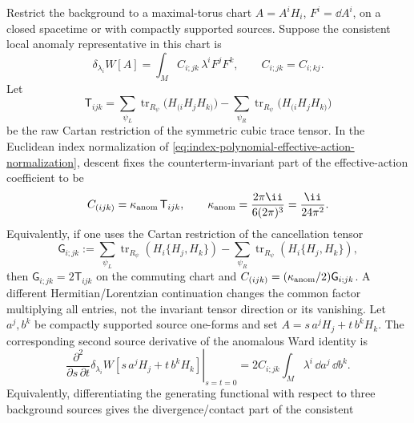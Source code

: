 \begin{proposition}
\label{prop:source-ward-test-cubic-anomaly}
Restrict the background to a maximal-torus chart
\(A=A^iH_i\), \(F^i=\dd A^i\), on a closed spacetime or with compactly
supported sources.  Suppose the consistent local anomaly representative in
this chart is
\begin{equation}
  \delta_{\lambda_i}W[A]
  =
  \int_M C_{i;jk}\,\lambda^i F^jF^k,
  \qquad C_{i;jk}=C_{i;kj}.
  \label{eq:cartan-source-anomaly-representative}
\end{equation}
Let
\begin{equation}
  \mathsf T_{ijk}
  =
  \sum_{\psi_L}\operatorname{tr}_{R_\psi}
  \bigl(H_{(i}H_jH_{k)}\bigr)
  -
  \sum_{\psi_R}\operatorname{tr}_{R_\psi}
  \bigl(H_{(i}H_jH_{k)}\bigr)
  \label{eq:cartan-raw-cubic-trace-tensor}
\end{equation}
be the raw Cartan restriction of the symmetric cubic trace tensor.  In the
Euclidean index normalization of
\eqref{eq:index-polynomial-effective-action-normalization}, descent fixes the
counterterm-invariant part of the effective-action coefficient to be
\begin{equation}
  C_{(ijk)}
  =
  \kappa_{\rm anom}\,\mathsf T_{ijk},
  \qquad
  \kappa_{\rm anom}
  =
  \frac{2\pi\ii}{6(2\pi)^3}
  =
  \frac{\ii}{24\pi^2}.
  \label{eq:source-ward-cubic-normalization-map}
\end{equation}
Equivalently, if one uses the Cartan restriction of the cancellation tensor
\[
  \mathsf G_{i;jk}
  :=
  \sum_{\psi_L}\operatorname{tr}_{R_\psi}(H_i\{H_j,H_k\})
  -
  \sum_{\psi_R}\operatorname{tr}_{R_\psi}(H_i\{H_j,H_k\}),
\]
then \(\mathsf G_{i;jk}=2\mathsf T_{ijk}\) on the commuting chart and
\(C_{(ijk)}=(\kappa_{\rm anom}/2)\mathsf G_{i;jk}\).  A different
Hermitian/Lorentzian continuation changes the common factor multiplying all
entries, not the invariant tensor direction or its vanishing.
Let \(a^j,b^k\) be compactly supported source one-forms and set
\(A=s\,a^jH_j+t\,b^kH_k\).  The corresponding second source derivative of
the anomalous Ward identity is
\begin{equation}
  \left.
  \frac{\partial^2}{\partial s\,\partial t}
  \delta_{\lambda_i}W[s\,a^jH_j+t\,b^kH_k]
  \right|_{s=t=0}
  =
  2C_{i;jk}\int_M \lambda^i\,\dd a^j\,\dd b^k .
  \label{eq:source-ward-cubic-contact-test}
\end{equation}
Equivalently, differentiating the generating functional with respect to
three background sources gives the divergence/contact part of the consistent

\end{proposition}
